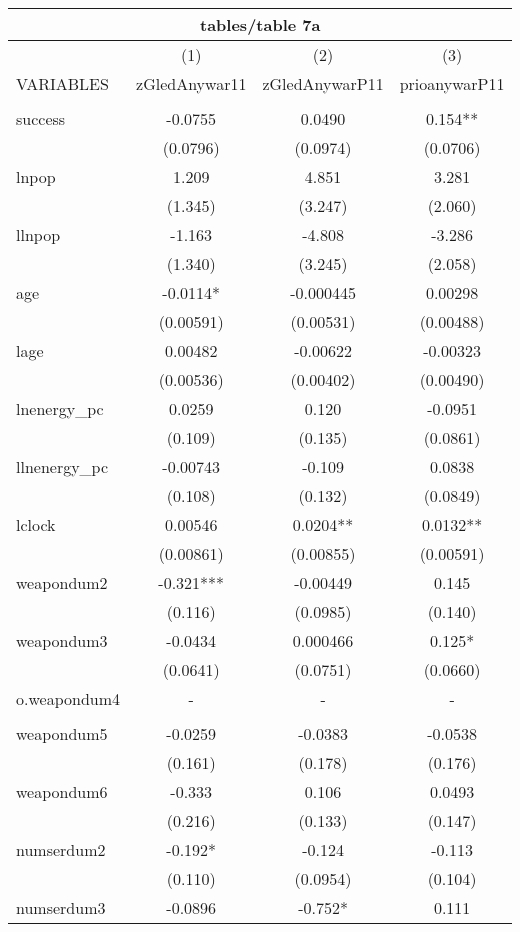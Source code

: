\documentclass[]{article}
\begin{document}
\begin{tabular}{lccc}
\multicolumn{4}{c}{tables/table 7a} \\ \hline
 & (1) & (2) & (3) \\
VARIABLES & zGledAnywar11 & zGledAnywarP11 & prioanywarP11 \\ \hline
 &  &  &  \\
success & -0.0755 & 0.0490 & 0.154** \\
 & (0.0796) & (0.0974) & (0.0706) \\
lnpop & 1.209 & 4.851 & 3.281 \\
 & (1.345) & (3.247) & (2.060) \\
llnpop & -1.163 & -4.808 & -3.286 \\
 & (1.340) & (3.245) & (2.058) \\
age & -0.0114* & -0.000445 & 0.00298 \\
 & (0.00591) & (0.00531) & (0.00488) \\
lage & 0.00482 & -0.00622 & -0.00323 \\
 & (0.00536) & (0.00402) & (0.00490) \\
lnenergy\_pc & 0.0259 & 0.120 & -0.0951 \\
 & (0.109) & (0.135) & (0.0861) \\
llnenergy\_pc & -0.00743 & -0.109 & 0.0838 \\
 & (0.108) & (0.132) & (0.0849) \\
lclock & 0.00546 & 0.0204** & 0.0132** \\
 & (0.00861) & (0.00855) & (0.00591) \\
weapondum2 & -0.321*** & -0.00449 & 0.145 \\
 & (0.116) & (0.0985) & (0.140) \\
weapondum3 & -0.0434 & 0.000466 & 0.125* \\
 & (0.0641) & (0.0751) & (0.0660) \\
o.weapondum4 & - & - & - \\
 &  &  &  \\
weapondum5 & -0.0259 & -0.0383 & -0.0538 \\
 & (0.161) & (0.178) & (0.176) \\
weapondum6 & -0.333 & 0.106 & 0.0493 \\
 & (0.216) & (0.133) & (0.147) \\
numserdum2 & -0.192* & -0.124 & -0.113 \\
 & (0.110) & (0.0954) & (0.104) \\
numserdum3 & -0.0896 & -0.752* & 0.111 \\

\end{tabular}
\end{document}
